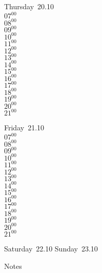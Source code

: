 \documentclass[11pt,a4paper]{book}\usepackage[]{graphicx}\usepackage[]{color}
\begin{document}
\clearpage
\begin{headerbox}
\end{headerbox}
\begin{weekdaybox}
  Thursday~20.10\\
  { 
  \vfill
  $07^{00}$\\
$08^{00}$\\
$09^{00}$\\
$10^{00}$\\
$11^{00}$\\
$12^{00}$\\
$13^{00}$\\
$14^{00}$\\
$15^{00}$\\
$16^{00}$\\
$17^{00}$\\
$18^{00}$\\
$19^{00}$\\
$20^{00}$\\
$21^{00}$\\
  }
\end{weekdaybox} 
\begin{weekdaybox}
  Friday~21.10\\
  { 
  \vfill
  $07^{00}$\\
$08^{00}$\\
$09^{00}$\\
$10^{00}$\\
$11^{00}$\\
$12^{00}$\\
$13^{00}$\\
$14^{00}$\\
$15^{00}$\\
$16^{00}$\\
$17^{00}$\\
$18^{00}$\\
$19^{00}$\\
$20^{00}$\\
$21^{00}$\\
  }
\end{weekdaybox}
\begin{weekendbox}
  Saturday~22.10
  \tcblower
  Sunday~23.10
\end{weekendbox} %
\begin{notebox}
  Notes
\end{notebox}
\clearpage
\end{document}
